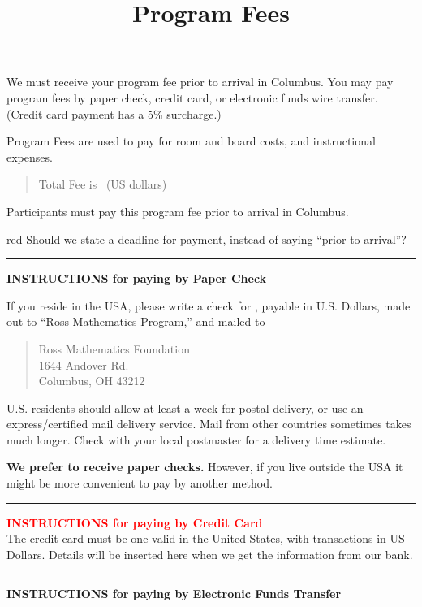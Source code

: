 \documentclass[11pt]{ross}
\title{Program Fees}
\begin{document}
\maketitle
We must receive your program fee prior to arrival in Columbus.  You
may pay program fees by paper check, credit card, or electronic funds wire
transfer. 
{\scriptsize  (Credit card payment has a 5\% surcharge.)}

Program Fees are used to pay for room and board costs, and instructional expenses.
\begin{quote}
Total Fee is \totalfee \ (US dollars)
\end{quote}  


Participants must pay this program fee prior to arrival in Columbus.\\
\begin{color}{red}
Should we state a deadline for payment, instead of saying ``prior to arrival''? \\
\end{color}

\bigskip  \hrule

{\bf INSTRUCTIONS for paying by Paper Check}

If you reside in the USA, please write a check for \totalfee, payable
in U.S. Dollars, made out to ``Ross Mathematics Program,'' and mailed
to
\begin{quote}
Ross Mathematics Foundation  \\
1644 Andover Rd. \\
Columbus, OH 43212
\end{quote}
U.S. residents should allow at least a week for postal delivery, or
use an express/certified mail delivery service. Mail from other countries
sometimes takes much longer.  Check with your local postmaster for a delivery
time estimate.

\textbf{We prefer to receive paper checks.} However, if you live outside the USA 
it might be more convenient to pay by another method.  \\

\bigskip  \hrule

\textcolor{red}
{\bf INSTRUCTIONS for paying by Credit Card} \\
The credit card must be one valid in the United States, with transactions in US Dollars.
Details will be inserted here when we get the information from our bank.\\
  
\bigskip  \hrule

{\bf INSTRUCTIONS for paying by Electronic Funds Transfer}
\end{document}
